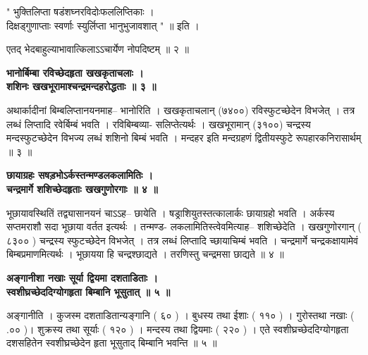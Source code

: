 \documentclass[11pt, openany]{book}
\begin{document}
{{{{\vspace{2mm}
\centering
 " भुक्तिलिप्ता षडंशघ्नरविदोःफललिप्तिकाः ।\\
 \hspace{2.5cm}
 दिक्षड्गुणाप्ताः स्वर्णाः स्युर्लिप्ता भानुभुजावशात् " ॥ इति ।

\vspace{2mm}
\justifying
 एतद् भेदबाहुल्याभावात्किलाऽऽचार्येण नोपदिष्टम् ॥ २ ॥

\vspace{2mm}
\centering
\textbf{
 भानोर्बिम्बा रविच्छेदहृता खखकृताचलाः ।\\
 \hspace{0.5cm}
 शशिनः खखभूरामाश्चन्द्रमन्दहरोद्धताः ॥ ३ ॥}

\vspace{2mm}
\justifying
 अथार्कादीनां बिम्बलिप्तानयनमाह-- भानोरिति । खखकृताचलान् (७४००)
रविस्फुटच्छेदेन विभजेत् । तत्र लब्धं लिप्तादि रवेर्बिम्बं भवति ।
रविबिम्बव्या-
सलिप्तेत्यर्थः । खखभूरामान् (३१००) चन्द्रस्य मन्दस्फुटच्छेदेन विभज्य
लब्धं शशिनो बिम्बं भवति । मन्दहर इति मन्दग्रहणं द्वितीयस्फुटे
रूपहारकनिरासार्थम् ॥ ३ ॥

\newpage
\thispagestyle{fancy}
\fancyhf{}
\rhead{[ग्रहणाधिकारः]}
\centering
\textbf{
 छायाग्रहः सषड़भोऽर्कस्तन्मण्डलकलामितिः ।\\
 \hspace{0.3cm}
 चन्द्रमार्गे शशिच्छेदहृताः खखगुणोरगाः ॥ ४ ॥}

\vspace{2mm}
\justifying
 भूछायावस्थितिं तद्व्यासानयनं चाऽऽह-- छायेति ।
षड्राशियुतस्तत्कालार्कः
छायाग्रहो भवति । अर्कस्य सप्तमराशौ सदा भूछाया वर्तत इत्यर्थः ।
तन्मण्ड-
लकलामितिस्त्वेवमित्याह-- शशिच्छेदेति । खखगुणोरगान् ( ८३०० )
चन्द्रस्य
स्फुटच्छेदेन विभजेत् । तत्र लब्धं लिप्तादि च्छायाचिम्बं भवति ।
चन्द्रमार्गे
चन्द्रकक्षायामेवं बिम्बप्रमाणमित्यर्थः । भूछायया हि चन्द्रश्छाद्यते
। तरणिस्तु
चन्द्रमसा छाद्यते ॥ ४ ॥

\vspace{2mm}
\centering
\textbf{
 अङ्गानीशा नखाः सूर्या द्वियमा दशताडिताः ।\\
 \hspace{0.8cm}
 स्वशीघ्रच्छेददिग्योगहृता बिम्बानि भूसुतात् ॥ ५ ॥}

\vspace{2mm}
\justifying
 अङ्गानीति । कुजस्म दशताडितान्यङ्गानि ( ६० ) ।  बुधस्य तथा ईशाः
( ११० ) । गुरोस्तथा नखाः (  .०० )। शुक्रस्य तथा सूर्याः ( १२०  ) ।
मन्दस्य तथा द्वियमाः ( २२० ) । एते स्वशीघ्रच्छेददिग्योगहृता दशसहितेन
स्वशीघ्रच्छेदेन हृता भूसुताद् बिम्बानि भवन्ति ॥ ५ ॥

}}}}
\end{document}

